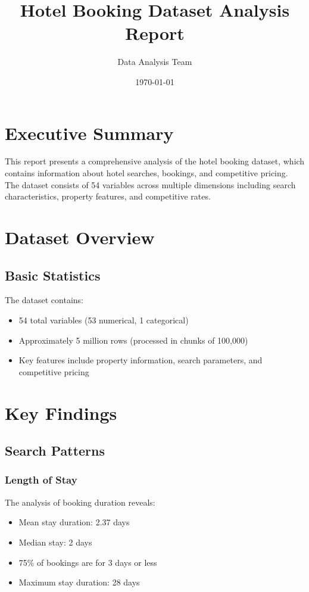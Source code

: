 \documentclass{article}
\title{Hotel Booking Dataset Analysis Report}
\author{Data Analysis Team}
\date{\today}
\begin{document}
\maketitle

\section{Executive Summary}
This report presents a comprehensive analysis of the hotel booking dataset, which contains information about hotel searches, bookings, and competitive pricing. The dataset consists of 54 variables across multiple dimensions including search characteristics, property features, and competitive rates.

\section{Dataset Overview}
\subsection{Basic Statistics}
The dataset contains:
\begin{itemize}
    \item 54 total variables (53 numerical, 1 categorical)
    \item Approximately 5 million rows (processed in chunks of 100,000)
    \item Key features include property information, search parameters, and competitive pricing
\end{itemize}



\section{Key Findings}

\subsection{Search Patterns}
\subsubsection{Length of Stay}
The analysis of booking duration reveals:
\begin{itemize}
    \item Mean stay duration: 2.37 days
    \item Median stay: 2 days
    \item 75\% of bookings are for 3 days or less
    \item Maximum stay duration: 28 days
\end{itemize}
\end{document}
